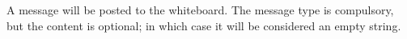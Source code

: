 A message will be posted to the whiteboard. The message
type is compulsory, but the content is optional; in which case
it will be considered an empty string.